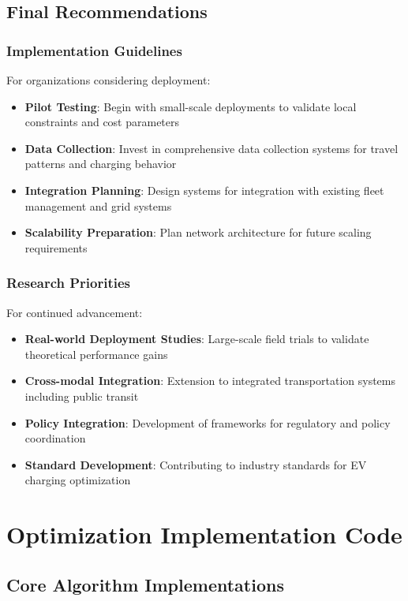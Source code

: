 \documentclass[12pt,a4paper]{article}
\begin{document}
\subsection{Final Recommendations}

\subsubsection{Implementation Guidelines}
For organizations considering deployment:

\begin{itemize}
    \item \textbf{Pilot Testing}: Begin with small-scale deployments to validate local constraints and cost parameters
    \item \textbf{Data Collection}: Invest in comprehensive data collection systems for travel patterns and charging behavior
    \item \textbf{Integration Planning}: Design systems for integration with existing fleet management and grid systems
    \item \textbf{Scalability Preparation}: Plan network architecture for future scaling requirements
\end{itemize}

\subsubsection{Research Priorities}
For continued advancement:

\begin{itemize}
    \item \textbf{Real-world Deployment Studies}: Large-scale field trials to validate theoretical performance gains
    \item \textbf{Cross-modal Integration}: Extension to integrated transportation systems including public transit
    \item \textbf{Policy Integration}: Development of frameworks for regulatory and policy coordination
    \item \textbf{Standard Development}: Contributing to industry standards for EV charging optimization
\end{itemize}

\section{Optimization Implementation Code}

\subsection{Core Algorithm Implementations}
\end{document}
